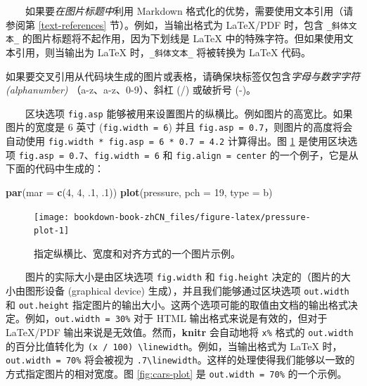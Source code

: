 \documentclass[
  12pt,
]{krantz}
\makeatletter
\newenvironment{Shaded}{\begin{snugshade}}{\end{snugshade}}
\newcommand{\AttributeTok}[1]{\textcolor[rgb]{0.13,0.29,0.53}{#1}}
\newcommand{\DecValTok}[1]{\textcolor[rgb]{0.00,0.00,0.81}{#1}}
\newcommand{\FunctionTok}[1]{\textcolor[rgb]{0.13,0.29,0.53}{\textbf{#1}}}
\newcommand{\NormalTok}[1]{#1}
\newcommand{\StringTok}[1]{\textcolor[rgb]{0.31,0.60,0.02}{#1}}
\newenvironment{kframe}{%
\medskip{}
\setlength{\fboxsep}{.8em}
 \def\at@end@of@kframe{}%
 \ifinner\ifhmode%
  \def\at@end@of@kframe{\end{minipage}}%
  \begin{minipage}{\columnwidth}%
 \fi\fi%
 \def\FrameCommand##1{\hskip\@totalleftmargin \hskip-\fboxsep
 \colorbox{shadecolor}{##1}\hskip-\fboxsep
     \hskip-\linewidth \hskip-\@totalleftmargin \hskip\columnwidth}%
 \MakeFramed {\advance\hsize-\width
   \@totalleftmargin\z@ \linewidth\hsize
   \@setminipage}}%
 {\par\unskip\endMakeFramed%
 \at@end@of@kframe}
\newenvironment{rmdblock}[1]
  {
  \begin{itemize}
  \renewcommand{\labelitemi}{
    \raisebox{-.7\height}[0pt][0pt]{
      {\setkeys{Gin}{width=3em,keepaspectratio}\texttt{[image: images/\#1]}}
    }
  }
  \setlength{\fboxsep}{1em}
  \begin{kframe}
  \item
  }
  {
  \end{kframe}
  \end{itemize}
  }
\newenvironment{rmdimportant}
  {\begin{rmdblock}{important}}
  {\end{rmdblock}}
\theoremstyle{definition}
\theoremstyle{definition}
\theoremstyle{definition}
\theoremstyle{definition}
\theoremstyle{remark}
\makeatother
\begin{document}
  如果要\emph{在图片标题中}利用 Markdown 格式化的优势，需要使用文本引用（请参阅第 \ref{text-references} 节）。例如，当输出格式为 LaTeX/PDF 时，包含 \texttt{\_斜体文本\_} 的图片标题将不起作用，因为下划线是 LaTeX 中的特殊字符。但如果使用文本引用，则当输出为 LaTeX 时，\texttt{\_斜体文本\_} 将被转换为 LaTeX 代码。

\begin{rmdimportant}
如果要交叉引用从代码块生成的图片或表格，请确保块标签仅包含\emph{字母与数字字符 (alphanumber)} （a-z、a-z、0-9）、斜杠 (/) 或破折号 (-)。
\end{rmdimportant}

  区块选项 \texttt{fig.asp} 能够被用来设置图片的纵横比。例如图片的高宽比。如果图片的宽度是 6 英寸 (\texttt{fig.width\ =\ 6}) 并且 \texttt{fig.asp\ =\ 0.7}，则图片的高度将会自动使用 \texttt{fig.width\ *\ fig.asp\ =\ 6\ *\ 0.7\ =\ 4.2} 计算得出。图 \ref{fig:pressure-plot} 是使用区块选项 \texttt{fig.asp\ =\ 0.7}、\texttt{fig.width\ =\ 6} 和 \texttt{fig.align\ =\ \textquotesingle{}center\textquotesingle{}} 的一个例子，它是从下面的代码中生成的：

\begin{Shaded}
\begin{Highlighting}[]
\FunctionTok{par}\NormalTok{(}\AttributeTok{mar =} \FunctionTok{c}\NormalTok{(}\DecValTok{4}\NormalTok{, }\DecValTok{4}\NormalTok{, .}\DecValTok{1}\NormalTok{, .}\DecValTok{1}\NormalTok{))}
\FunctionTok{plot}\NormalTok{(pressure, }\AttributeTok{pch =} \DecValTok{19}\NormalTok{, }\AttributeTok{type =} \StringTok{\textquotesingle{}b\textquotesingle{}}\NormalTok{)}
\end{Highlighting}
\end{Shaded}

\begin{figure}

{\centering \texttt{[image: bookdown-book-zhCN\_files/figure-latex/pressure-plot-1]} 

}

\caption{指定纵横比、宽度和对齐方式的一个图片示例。}\label{fig:pressure-plot}
\end{figure}

  图片的实际大小是由区块选项 \texttt{fig.width} 和 \texttt{fig.height} 决定的（图片的大小由图形设备 (graphical device) 生成），并且我们能够通过区块选项 \texttt{out.width} 和 \texttt{out.height} 指定图片的输出大小。这两个选项可能的取值由文档的输出格式决定。例如，\texttt{out.width\ =\ \textquotesingle{}30\%\textquotesingle{}} 对于 HTML 输出格式来说是有效的，但对于 LaTeX/PDF 输出来说是无效值。然而，\textbf{knitr} 会自动地将 \texttt{x\%} 格式的 \texttt{out.width} 的百分比值转化为 \texttt{(x\ /\ 100)\ \textbackslash{}linewidth}。例如，当输出格式为 LaTeX 时，\texttt{out.width\ =\ \textquotesingle{}70\%\textquotesingle{}} 将会被视为 \texttt{.7\textbackslash{}linewidth}。这样的处理使得我们能够以一致的方式指定图片的相对宽度。图 \ref{fig:cars-plot} 是 \texttt{out.width\ =\ 70\%} 的一个示例。
\end{document}
